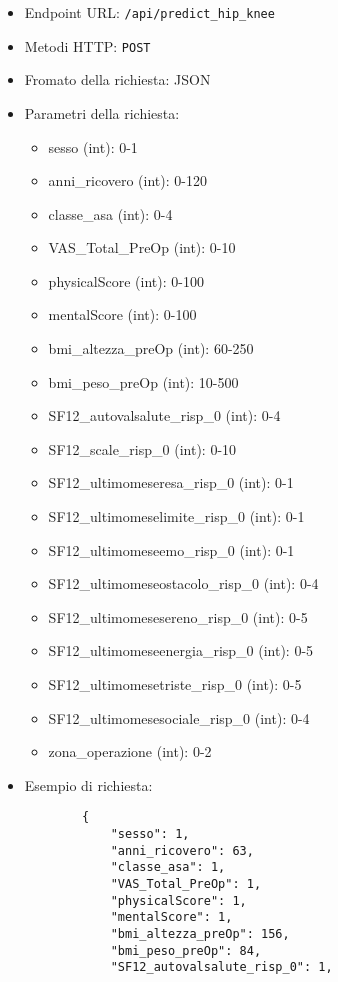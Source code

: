 \begin{itemize}
  \item Endpoint URL: \verb|/api/predict_hip_knee|
  \item Metodi HTTP: \verb|POST|
  \item Fromato della richiesta: JSON
  \item Parametri della richiesta:
    \begin{itemize}
        \item sesso (int): 0-1
        \item anni\_ricovero (int): 0-120
        \item classe\_asa (int): 0-4
        \item VAS\_Total\_PreOp (int): 0-10
        \item physicalScore (int): 0-100
        \item mentalScore (int): 0-100
        \item bmi\_altezza\_preOp (int): 60-250
        \item bmi\_peso\_preOp (int): 10-500
        \item SF12\_autovalsalute\_risp\_0 (int): 0-4
        \item SF12\_scale\_risp\_0 (int): 0-10
        \item SF12\_ultimomeseresa\_risp\_0 (int): 0-1
        \item SF12\_ultimomeselimite\_risp\_0 (int): 0-1
        \item SF12\_ultimomeseemo\_risp\_0 (int): 0-1
        \item SF12\_ultimomeseostacolo\_risp\_0 (int): 0-4
        \item SF12\_ultimomesesereno\_risp\_0 (int): 0-5
        \item SF12\_ultimomeseenergia\_risp\_0 (int): 0-5
        \item SF12\_ultimomesetriste\_risp\_0 (int): 0-5
        \item SF12\_ultimomesesociale\_risp\_0 (int): 0-4
        \item zona\_operazione (int): 0-2
    \end{itemize}
  \item Esempio di richiesta:
    \begin{verbatim}
        {
            "sesso": 1,
            "anni_ricovero": 63,
            "classe_asa": 1,
            "VAS_Total_PreOp": 1,
            "physicalScore": 1,
            "mentalScore": 1,
            "bmi_altezza_preOp": 156,
            "bmi_peso_preOp": 84,
            "SF12_autovalsalute_risp_0": 1,

\end{verbatim}
\end{itemize}
